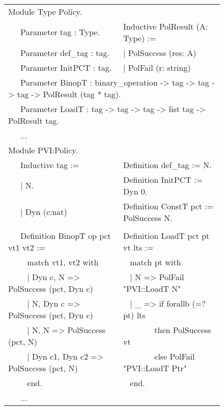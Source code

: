 \documentclass{llncs}
\begin{document}
\begin{figure}[t]

  {\tt \scriptsize
    \begin{tabular}{l l}
      Module Type Policy. \\[0.5em]

      \ \ \ Parameter tag : Type.     & Inductive PolResult (A: Type) := \\
      \ \ \  Parameter def\_tag : tag. & | PolSuccess (res: A) \\
      \ \ \ Parameter InitPCT : tag.  & | PolFail (r: string) \\[0.5em]
  
      \multicolumn{2}{l}{\ \ \ Parameter BinopT : binary\_operation ->
        tag -> tag -> tag -> PolResult (tag * tag).} \\
      \multicolumn{2}{l}{\ \ \ Parameter LoadT : tag -> tag -> tag ->
        list tag -> PolResult tag.} \\

      \ \ \ ... \\[1em]

      Module PVI:Policy. \\[0.5em]

      \ \ \ Inductive tag := & Definition def\_tag := N.  \\
      \ \ \ | N. & Definition InitPCT := Dyn 0. \\
      \ \ \ | Dyn (c:nat) & Definition ConstT pct := PolSuccess N. \\
      & \\[0.5em]

      \ \ \ Definition BinopT op pct vt1 vt2 :=       & Definition LoadT pct pt vt lts := \\
      \ \ \ ~ match vt1, vt2 with                     & ~ match pt with \\
      \ \ \ ~ | Dyn c, N =>  PolSuccess (pct, Dyn c)  & ~ | N => PolFail "PVI::LoadT N" \\
      \ \ \ ~ | N, Dyn c => PolSuccess (pct, Dyn c)   & ~ | \_ => if forallb (=? pt) lts \\
      \ \ \ ~ | N, N => PolSuccess (pct, N)           & ~ ~ ~ ~ ~then PolSuccess vt \\
      \ \ \ ~ | Dyn c1, Dyn c2 => PolSuccess (pct, N) &  ~ ~ ~ ~ ~else PolFail "PVI::LoadT Ptr" \\
      \ \ \ ~ end.                                    & ~ end. \\
      \ \ \ ... \\[1em]
    \end{tabular}
    
}
\end{figure}
\end{document}
